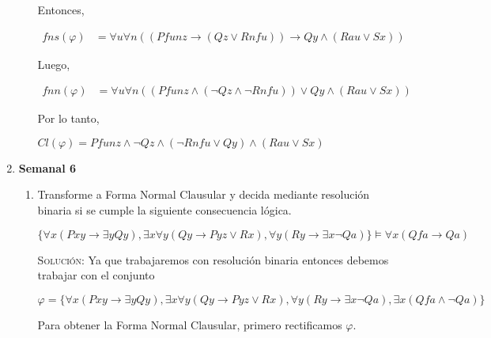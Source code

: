 \documentclass[letterpaper,12pt]{article}
\begin{document}
\begin{enumerate}
\begin{enumerate}
        Entonces,
        
        \begin{align*}
            fns(\varphi) &=
            \forall u \forall n ((Pfunz \rightarrow 
            (Qz \lor Rnfu)) \rightarrow Qy \land (Rau \lor Sx)) 
        \end{align*}
        
        Luego, 
        
        \begin{align*}
            fnn(\varphi) &=
            \forall u \forall n ((Pfunz \land (\neg Qz \land \neg Rnfu)) 
            \lor Qy \land (Rau \lor Sx)) 
        \end{align*}

        Por lo tanto, 
        
        \begin{center}
            $Cl(\varphi) =
            Pfunz \land \neg Qz \land (\neg Rnfu \lor Qy) \land (Rau \lor Sx)$
        \end{center}    
    \end{enumerate}

    \item \textbf{Semanal 6}
    
    \begin{enumerate}
        \item Transforme a Forma Normal Clausular y decida mediante resolución
        binaria si se cumple la siguiente consecuencia lógica.

        \begin{center}
            $\{\forall x (Pxy \rightarrow \exists y Qy), 
            \exists x \forall y (Qy \rightarrow Pyz \lor Rx),
            \forall y (Ry \rightarrow \exists x \neg Qa) \} 
            \models \forall x (Qfa \rightarrow Qa)$
        \end{center}

        \textsc{Solución:} Ya que trabajaremos con resolución binaria entonces 
        debemos trabajar con el conjunto

        \begin{center}
            $\varphi = \{\forall x (Pxy \rightarrow \exists y Qy), 
            \exists x \forall y (Qy \rightarrow Pyz \lor Rx),
            \forall y (Ry \rightarrow \exists x \neg Qa),
            \exists x (Qfa \land \neg Qa)\}$
        \end{center}

        Para obtener la Forma Normal Clausular, primero
        rectificamos $\varphi$.
        

\end{enumerate}
\end{enumerate}
\end{document}
